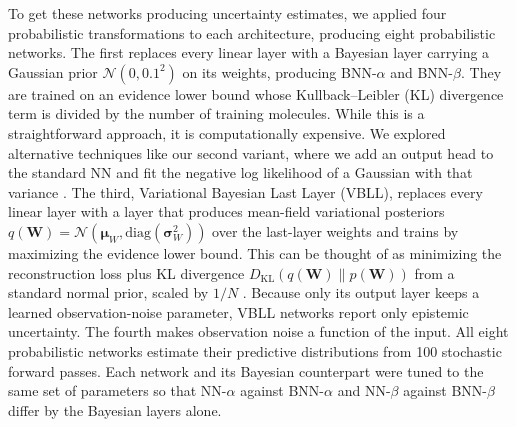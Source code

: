 To get these networks producing uncertainty estimates, we applied four probabilistic transformations to each architecture, producing eight probabilistic networks. The first replaces every linear layer with a Bayesian layer carrying a Gaussian prior $\mathcal{N}(0, 0.1^2)$ on its weights, producing BNN-$\alpha$ and BNN-$\beta$. They are trained on an evidence lower bound whose  Kullback–Leibler (KL) divergence term is divided by the number of training molecules. While this is a straightforward approach, it is computationally expensive. We explored alternative techniques like our second variant, where we add an output head to the standard NN and fit the negative log likelihood of a Gaussian with that variance \citep{kendall2017}. The third, Variational Bayesian Last Layer (VBLL), replaces every linear layer with a layer that produces mean-field variational posteriors $q(\mathbf{W}) = \mathcal{N}(\boldsymbol{\mu}_W, \text{diag}(\boldsymbol{\sigma}_W^2))$ over the last-layer weights and trains by maximizing the evidence lower bound. This can be thought of as minimizing the reconstruction loss plus KL divergence $D_{\text{KL}}(q(\mathbf{W}) \| p(\mathbf{W}))$ from a standard normal prior, scaled by $1/N$ \citep{Harrison2024}. Because only its output layer keeps a learned observation-noise parameter, VBLL networks report only epistemic uncertainty. The fourth makes observation noise a function of the input. All eight probabilistic networks estimate their predictive distributions from 100 stochastic forward passes. Each network and its Bayesian counterpart were tuned to the same set of parameters so that NN-$\alpha$ against BNN-$\alpha$ and NN-$\beta$ against BNN-$\beta$ differ by the Bayesian layers alone.

